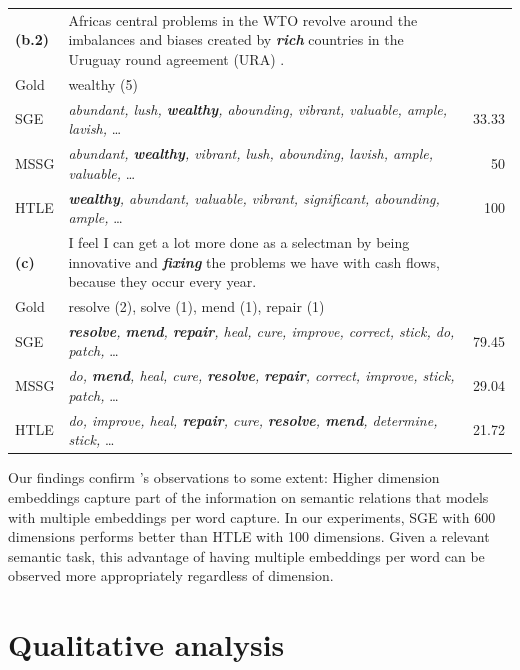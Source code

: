 \begin{table}
\begin{center}
\begin{tabularx}{\textwidth}{lXr}
 \midrule
\textbf{ (b.2)}  &Africas central problems in the WTO revolve around the imbalances and biases created by \textit{\textbf{rich}} countries in the Uruguay round agreement (URA) . &  \\
 \hdashline
\rule{0pt}{2.5ex} 
   Gold   & wealthy (5) &  \\
  \hdashline
\rule{0pt}{2.5ex} 
   SGE   & \textit{abundant, lush, \textbf{wealthy}, abounding, vibrant, valuable, ample, lavish,} \ldots &  33.33\\
   MSSG  & \textit{abundant, \textbf{wealthy}, vibrant, lush, abounding, lavish, ample, valuable,} \ldots & 50 \\
   HTLE   & \textit{\textbf{wealthy}, abundant, valuable, vibrant, significant, abounding, ample,} \ldots  & 100 \\ 
 \midrule
\textbf{ (c)}   & I feel I can get a lot more done as a selectman by being innovative and \textit{\textbf{fixing}} the problems we have with cash flows, because they occur every year. &  \\
  \hdashline
\rule{0pt}{2.5ex} 
   Gold   & resolve (2), solve (1), mend (1), repair (1) &  \\
  \hdashline
\rule{0pt}{2.5ex} 
   SGE  & \textit{\textbf{resolve}, \textbf{mend}, \textbf{repair}, heal, cure, improve, correct, stick, do, patch,} \ldots  &  79.45  \\
    MSSG  & \textit{do, \textbf{mend}, heal, cure, \textbf{resolve}, \textbf{repair}, correct, improve, stick, patch,} \ldots & 29.04 \\
   HTLE   & \textit{do, improve, heal, \textbf{repair}, cure, \textbf{resolve}, \textbf{mend}, determine, stick,} \ldots   & 21.72  \\ 
 \bottomrule
\end{tabularx}
\end{center}
\end{table}

Our findings confirm \citet{li-jurafsky:2015:EMNLP}'s observations to some extent: 
Higher dimension embeddings capture part of the information on semantic relations that models with multiple embeddings per word capture.
In our experiments, SGE with 600 dimensions performs better than HTLE with 100 dimensions. 
Given a relevant semantic task, this advantage of having multiple embeddings per word can be observed more appropriately regardless of dimension.
   
\section{Qualitative analysis} \label{embindepth}

